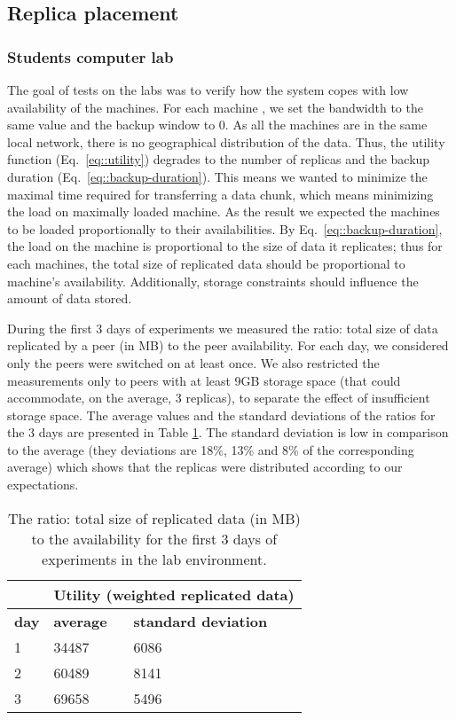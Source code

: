\documentclass[10pt, final, conference, letterpaper]{IEEEtran}
\begin{document}
\subsection{Replica placement}

\subsubsection{Students computer lab}
The goal of tests on the labs was to verify how the system copes with low availability of the machines. 
For each machine , we set the bandwidth  to the same value and the backup window  to 0. As all the machines are in the same local network, there is no geographical distribution of the data. Thus, the utility function (Eq.~\ref{eq::utility}) degrades to the number of replicas and the backup duration (Eq.~\ref{eq::backup-duration}).
This means we wanted to minimize the maximal time required for transferring a data chunk, which means minimizing the load on maximally loaded machine. As the result we expected the machines to be loaded proportionally to their availabilities. By Eq.~\ref{eq::backup-duration}, the load on the machine is proportional to the size of data it replicates; thus for each machines, the total size of replicated data should be proportional to machine's availability. Additionally, storage constraints should influence the amount of data stored.


During the first 3 days of experiments we measured the ratio: total size of data replicated by a peer (in MB) to the peer availability. For each day, we considered only the peers were switched on at least once. We also restricted the measurements only to peers with at least 9GB storage space (that could accommodate, on the average, 3 replicas), to separate the effect of insufficient storage space.
The average values and the standard deviations of the ratios for the 3 days are presented in Table \ref{tab::replicaPlacement}. The standard deviation is low in comparison to the average (they deviations are 18\%, 13\% and 8\% of the corresponding average) which shows that the replicas were distributed according to our expectations.

\begin{table}[tb]
    \centering
    \caption{The ratio: total size of replicated data (in MB) to the availability for the first 3 days of experiments in the lab environment.}
    \label{tab::replicaPlacement}
    \begin{tabular}{ | l | l | l |}
    \hline
    & \multicolumn{2}{c|}{\textbf{Utility (weighted replicated data)}} \\ \hline
    \textbf{day} & \textbf{average} & \textbf{standard deviation} \\ \hline \hline
    1 & 34487 &  6086 \\ \hline
    2 & 60489 &  8141 \\ \hline
    3 & 69658 &  5496 \\ \hline
    \end{tabular}
\end{table}
\end{document}
